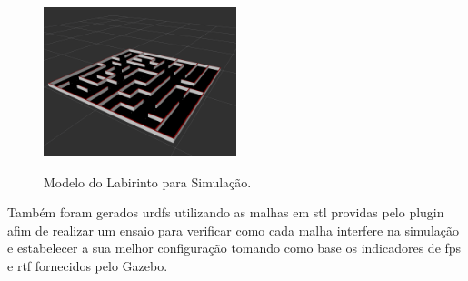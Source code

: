 \begin{figure}[H]
	\centering
	\caption{Modelo do Labirinto para Simulação.}
	\includegraphics[width=0.5\textwidth]
	{Figures/minus_maze_description}
	\label{fig:minus_maze_description}
\end{figure}

Também foram gerados \glspl*{urdf} utilizando as malhas em \gls*{stl} providas pelo plugin afim de realizar um ensaio para verificar como cada malha interfere na simulação e estabelecer a sua melhor configuração tomando como base os indicadores de \gls*{fps} e \gls*{rtf} fornecidos pelo Gazebo.
